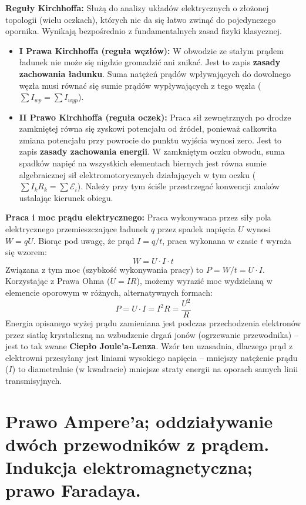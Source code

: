 \documentclass[11pt, a4paper]{article}
\begin{document}
\textbf{Reguły Kirchhoffa:}
Służą do analizy układów elektrycznych o złożonej topologii (wielu oczkach), których nie da się łatwo zwinąć do pojedynczego opornika. Wynikają bezpośrednio z fundamentalnych zasad fizyki klasycznej.
\begin{itemize}
    \item \textbf{I Prawa Kirchhoffa (reguła węzłów):} W obwodzie ze stałym prądem ładunek nie może się nigdzie gromadzić ani znikać. Jest to zapis \textbf{zasady zachowania ładunku}. Suma natężeń prądów wpływających do dowolnego węzła musi równać się sumie prądów wypływających z tego węzła ($\sum I_{wp} = \sum I_{wyp}$).
    \item \textbf{II Prawo Kirchhoffa (reguła oczek):} Praca sił zewnętrznych po drodze zamkniętej równa się zyskowi potencjału od źródeł, ponieważ całkowita zmiana potencjału przy powrocie do punktu wyjścia wynosi zero. Jest to zapis \textbf{zasady zachowania energii}. W zamkniętym oczku obwodu, suma spadków napięć na wszystkich elementach biernych jest równa sumie algebraicznej sił elektromotorycznych działających w tym oczku ($\sum I_k R_k = \sum \mathcal{E}_i$). Należy przy tym ściśle przestrzegać konwencji znaków ustalając kierunek obiegu.
\end{itemize}

\textbf{Praca i moc prądu elektrycznego:}
Praca wykonywana przez siły pola elektrycznego przemieszczające ładunek $q$ przez spadek napięcia $U$ wynosi $W = qU$. Biorąc pod uwagę, że prąd $I = q/t$, praca wykonana w czasie $t$ wyraża się wzorem:
\[
W = U \cdot I \cdot t
\]
Związana z tym moc (szybkość wykonywania pracy) to $P = W/t = U \cdot I$. Korzystając z Prawa Ohma ($U=IR$), możemy wyrazić moc wydzielaną w elemencie oporowym w różnych, alternatywnych formach:
\[
P = U \cdot I = I^2 R = \frac{U^2}{R}
\]
Energia opisanego wyżej prądu zamieniana jest podczas przechodzenia elektronów przez siatkę krystaliczną na wzbudzenie drgań jonów (ogrzewanie przewodnika) – jest to tak zwane \textbf{Ciepło Joule'a-Lenza}. Wzór ten uzasadnia, dlaczego prąd z elektrowni przesyłany jest liniami wysokiego napięcia – mniejszy natężenie prądu ($I$) to diametralnie (w kwadracie) mniejsze straty energii na oporach samych linii transmisyjnych.

\section{Prawo Ampere'a; oddziaływanie dwóch przewodników z prądem. Indukcja elektromagnetyczna; prawo Faradaya.}
\end{document}
